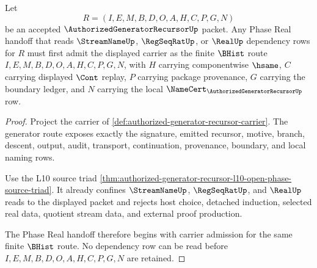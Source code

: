 \begin{theorem}
\label{thm:authorized-generator-recursor-phase-real-carrier-readiness}
Let
$$
R=(I,E,M,B,D,O,A,H,C,P,G,N)
$$
be an accepted $\AuthorizedGeneratorRecursorUp$ packet. Any Phase Real handoff that reads $\StreamNameUp$, $\RegSeqRatUp$, or $\RealUp$ dependency rows for $R$ must first admit the displayed carrier as the finite $\BHist$ route $I,E,M,B,D,O,A,H,C,P,G,N$, with $H$ carrying componentwise $\hsame$, $C$ carrying displayed $\Cont$ replay, $P$ carrying package provenance, $G$ carrying the boundary ledger, and $N$ carrying the local $\NameCert_{\AuthorizedGeneratorRecursorUp}$ row.
\end{theorem}
\begin{proof}
Project the carrier of \autoref{def:authorized-generator-recursor-carrier}. The generator route exposes exactly the signature, emitted recursor, motive, branch, descent, output, audit, transport, continuation, provenance, boundary, and local naming rows.

Use the L10 source triad \autoref{thm:authorized-generator-recursor-l10-open-phase-source-triad}. It already confines $\StreamNameUp$, $\RegSeqRatUp$, and $\RealUp$ reads to the displayed packet and rejects host choice, detached induction, selected real data, quotient stream data, and external proof production.

The Phase Real handoff therefore begins with carrier admission for the same finite $\BHist$ route. No dependency row can be read before $I,E,M,B,D,O,A,H,C,P,G,N$ are retained.
\end{proof}

